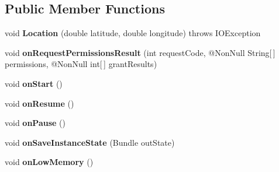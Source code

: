 \subsection*{Public Member Functions}
\begin{DoxyCompactItemize}
\item 
\mbox{\label{classcom_1_1mycompany_1_1myfirstmapboxapp_1_1_main_activity_a7b7274e7f03d5f3730322068bd8d548f}} 
void {\bfseries Location} (double latitude, double longitude)  throws I\+O\+Exception
\item 
\mbox{\label{classcom_1_1mycompany_1_1myfirstmapboxapp_1_1_main_activity_aec77dc6aadda670323633d69ad937919}} 
void {\bfseries on\+Request\+Permissions\+Result} (int request\+Code, @Non\+Null String\mbox{[}$\,$\mbox{]} permissions, @Non\+Null int\mbox{[}$\,$\mbox{]} grant\+Results)
\item 
\mbox{\label{classcom_1_1mycompany_1_1myfirstmapboxapp_1_1_main_activity_a7b31a5846318bf35eeeda0e6d225b985}} 
void {\bfseries on\+Start} ()
\item 
\mbox{\label{classcom_1_1mycompany_1_1myfirstmapboxapp_1_1_main_activity_aeaaa085f6f667e7721c4283844d9fa6d}} 
void {\bfseries on\+Resume} ()
\item 
\mbox{\label{classcom_1_1mycompany_1_1myfirstmapboxapp_1_1_main_activity_ad2ac0013cab496fe5a3abd77b2c97e5c}} 
void {\bfseries on\+Pause} ()
\item 
\mbox{\label{classcom_1_1mycompany_1_1myfirstmapboxapp_1_1_main_activity_ab169687e9e69f569d2aa05e6780e93ee}} 
void {\bfseries on\+Save\+Instance\+State} (Bundle out\+State)
\item 
\mbox{\label{classcom_1_1mycompany_1_1myfirstmapboxapp_1_1_main_activity_a827f0abe7250e144a6facfa484f2563b}} 
void {\bfseries on\+Low\+Memory} ()
\end{DoxyCompactItemize}
